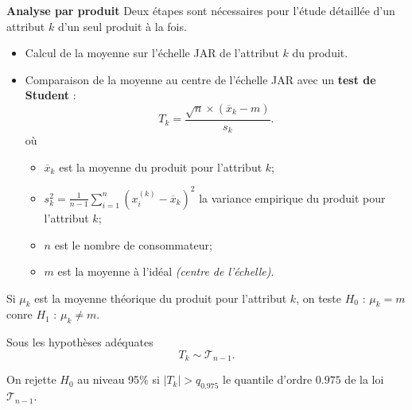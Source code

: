 \documentclass[aspectratio=169,xcolor=dvipsnames]{beamer}
\begin{document}
\begin{frame}
	\begin{block}{\textbf{Analyse par produit}}
	Deux étapes sont nécessaires pour l'étude détaillée d'un attribut $k$ d'un seul produit à la fois.
		\begin{itemize}
		\item Calcul de la moyenne sur l'échelle JAR de l'attribut $k$ du produit.
		\item Comparaison de la moyenne au centre de l'échelle JAR avec un \textbf{test de Student} :
			\[
			T_k = \dfrac{\sqrt{n}\times(\overline{x}_k-m)}{s_k}.
			\]
		où
			\begin{itemize}
			\item $\overline{x}_k$ est la moyenne du produit pour l'attribut $k$;
			\item $s_k^2 = \frac{1}{n-1} \sum_{i=1}^n (x_i^{(k)} -\overline{x}_k)^2$ la variance empirique du produit pour l'attribut $k$;
			\item $n$ est le nombre de consommateur;
			\item $m$ est la moyenne à l'idéal \emph{(centre de l'échelle)}.
			\end{itemize}
		\end{itemize}
	\end{block}
\end{frame}

\begin{frame}

\vfill

\textcolor{nyubluedarker}{\faCogs} Si $\mu_k$ est la moyenne théorique du produit pour l'attribut $k$, on teste $H_0$ : $\mu_k = m$ conre $H_1$ : $\mu_k \neq m$.

\medskip

\textcolor{nyubluedarker}{\faCogs} Sous les hypothèses adéquates
	\[
	T_k \sim \mathcal{T}_{n-1}.
	\]

\medskip

\textcolor{nyubluedarker}{\faCogs} On rejette $H_0$ au niveau 95\% si $ \left| T_k \right| > q_{0.975}$ le quantile d'ordre $0.975$ de la loi $\mathcal{T}_{n-1}$.

\vfill

\end{frame}
\end{document}
